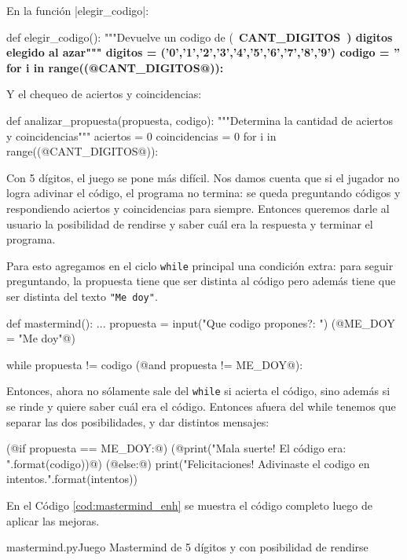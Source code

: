 \begin{enumerate}
En la función |elegir_codigo|:

\begin{codigo-python-sn}
def elegir_codigo():
    """Devuelve un codigo de (~\bfseries{CANT\_DIGITOS}~) digitos elegido al azar"""
    digitos = ('0','1','2','3','4','5','6','7','8','9')
    codigo = ''
    for i in range((@CANT_DIGITOS@)):
\end{codigo-python-sn}

Y el chequeo de aciertos y coincidencias:

\begin{codigo-python-sn}
def analizar_propuesta(propuesta, codigo):
    """Determina la cantidad de aciertos y coincidencias"""
    aciertos = 0
    coincidencias = 0
    for i in range((@CANT_DIGITOS@)):
\end{codigo-python-sn}

Con 5 dígitos, el juego se pone más difícil. Nos damos cuenta que si el jugador
no logra adivinar el código, el programa no termina: se queda preguntando
códigos y respondiendo aciertos y coincidencias para siempre. Entonces queremos
darle al usuario la posibilidad de rendirse y saber cuál era la respuesta y
terminar el programa.

Para esto agregamos en el ciclo \lstinline!while! principal una condición
extra: para seguir preguntando, la propuesta tiene que ser distinta al
código pero además tiene que ser distinta del texto \lstinline!"Me doy"!.

\begin{codigo-python-sn}
def mastermind():
    ...
    propuesta = input("Que codigo propones?: ")
    (@ME_DOY = "Me doy"@)

    while propuesta != codigo (@and propuesta != ME_DOY@):
\end{codigo-python-sn}

Entonces, ahora no sólamente sale del \lstinline!while! si acierta el
código, sino además si se rinde y quiere saber cuál era el código. Entonces
afuera del while tenemos que separar las dos posibilidades, y dar distintos
mensajes:

\begin{codigo-python-sn}
    (@if propuesta == ME_DOY:@)
        (@print("Mala suerte! El código era: {}".format(codigo))@)
    (@else:@)
        print("Felicitaciones! Adivinaste el codigo en {} intentos.".format(intentos))
\end{codigo-python-sn}

En el Código \ref{cod:mastermind_enh} se muestra el código completo luego de
aplicar las mejoras.

\begin{codigo}{\label{cod:mastermind_enh} mastermind.py}{Juego Mastermind de 5
    dígitos y con posibilidad de rendirse}

\end{codigo}
\end{enumerate}

